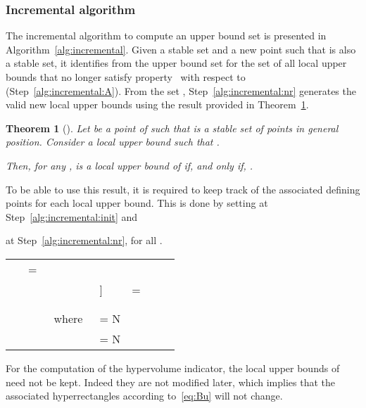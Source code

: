\documentclass[a4paper,11pt]{article}
\newtheorem{theorem}[lemma]{Theorem}
\newcommand{\lub}{local upper bound}
\begin{document}
\subsubsection{Incremental algorithm}\label{sub:incremental}

The incremental algorithm to compute an upper bound set is presented in Algorithm~\ref{alg:incremental}.
Given a stable set  and a new point  such that  is also a stable set,
it identifies from the upper bound set for  the set  of all local upper bounds
that no longer satisfy property~ with respect to  (Step~\ref{alg:incremental:A}).
From the set , Step~\ref{alg:incremental:nr} generates the valid new local upper bounds 
using the result provided in Theorem~\ref{th:incremental}. 


\begin{theorem}[\citealp{KlaLacVan15}]\label{th:incremental}
  Let  be a point of  such that  
  is a stable set of points in general position. 
  Consider a \lub{}  such that .
  
  Then, for any ,  
  is a \lub{} of  
  if, and only if, .
\end{theorem}

To be able to use this result, it is required to keep track of the associated defining points for each local upper bound. 
This is done by setting  
at Step~\ref{alg:incremental:init}
and 

at Step~\ref{alg:incremental:nr},
for all .

\begin{algorithm}
  \begin{tabular}{llll}
    \nl\UBSI{}~      & =~ & \\
    &&&\-8pt]
    \nl\UBSNI{}~ & =~ & \\
    \nl                         &    & \\ 
    \nl                         &    & \\ 
    \nl                         &    & where~ &  = N\;\\
    \nl                         &    &        &  = N\;
  \end{tabular}
  \caption{Nonincremental algorithm to compute an upper bound set 
  -- assumes that , for all \label{alg:nonincremental}}
\end{algorithm}

For the computation of the hypervolume indicator,
the local upper bounds of  need not be kept.
Indeed they are not modified later, which implies that the associated hyperrectangles according to~\eqref{eq:Bu}
will not change.
\end{document}
